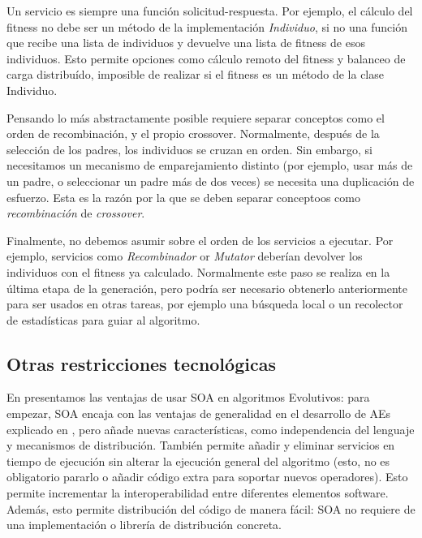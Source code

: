\documentclass[runningheads]{llncs}
\begin{document}
Un servicio es siempre una función solicitud-respuesta. Por ejemplo, el cálculo del fitness no debe ser un método de la implementación {\em Individuo}, si no una función que recibe una lista de individuos y devuelve una lista de fitness de esos individuos. Esto permite opciones como cálculo remoto del fitness y balanceo de carga distribuído, imposible de realizar si el fitness es un método de la clase Individuo.

Pensando lo más abstractamente posible requiere separar conceptos como el orden de recombinación, y el propio crossover. Normalmente, después de la selección de los padres, los individuos se cruzan en orden. Sin embargo, si necesitamos un mecanismo de emparejamiento distinto (por ejemplo, usar más de un padre, o seleccionar un padre más de dos veces) se necesita una duplicación de esfuerzo. Esta es la razón por la que se deben separar conceptoos como {\em recombinación} de {\em crossover}. 

Finalmente, no debemos asumir sobre el orden de los servicios a ejecutar. Por ejemplo, servicios como {\em Recombinador} or {\em Mutator} deberían devolver los individuos con el fitness ya calculado. Normalmente este paso se realiza en la última etapa de la generación, pero podría ser necesario obtenerlo anteriormente para ser usados en otras tareas, por ejemplo una búsqueda local o un recolector de estadísticas para guiar al algoritmo.

\subsection{Otras restricciones tecnológicas}

En \cite{OSGILIATH} presentamos las ventajas de usar SOA en algoritmos Evolutivos: para empezar, SOA encaja con las ventajas de generalidad en el desarrollo de AEs explicado en \cite{GENERICITY05}, pero añade nuevas características, como independencia del lenguaje y mecanismos de distribución. También permite añadir y eliminar servicios en tiempo de ejecución sin alterar la ejecución general del algoritmo (esto, no es obligatorio pararlo o añadir código extra para soportar nuevos operadores). Esto permite incrementar la interoperabilidad entre diferentes elementos software. Además, esto permite distribución del código de manera fácil: SOA no requiere de una implementación o librería de distribución concreta.
\end{document}
